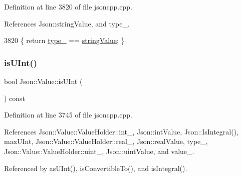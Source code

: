 Definition at line 3820 of file jsoncpp.\+cpp.



References Json\+::string\+Value, and type\+\_\+.


\begin{DoxyCode}
3820 \{ \textcolor{keywordflow}{return} \hyperlink{class_json_1_1_value_abd222c2536dc88bf330dedcd076d2356}{type\_} == \hyperlink{namespace_json_a7d654b75c16a57007925868e38212b4ea804ef857affea2d415843c73f261c258}{stringValue}; \}
\end{DoxyCode}
\mbox{\label{class_json_1_1_value_abdda463d3269015f883587349726cfbc}} 
\subsubsection{\texorpdfstring{is\+U\+Int()}{isUInt()}}
{\footnotesize\ttfamily bool Json\+::\+Value\+::is\+U\+Int (\begin{DoxyParamCaption}{ }\end{DoxyParamCaption}) const}



Definition at line 3745 of file jsoncpp.\+cpp.



References Json\+::\+Value\+::\+Value\+Holder\+::int\+\_\+, Json\+::int\+Value, Json\+::\+Is\+Integral(), max\+U\+Int, Json\+::\+Value\+::\+Value\+Holder\+::real\+\_\+, Json\+::real\+Value, type\+\_\+, Json\+::\+Value\+::\+Value\+Holder\+::uint\+\_\+, Json\+::uint\+Value, and value\+\_\+.



Referenced by as\+U\+Int(), is\+Convertible\+To(), and is\+Integral().



